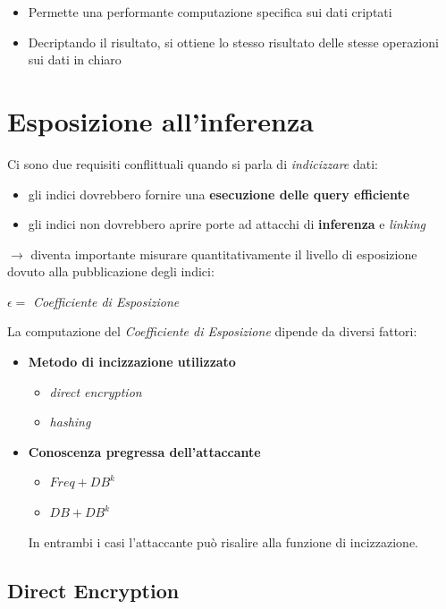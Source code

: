 \documentclass{report}
\begin{document}
\begin{itemize}
    \item Permette una performante computazione specifica sui dati criptati 
    \item Decriptando il risultato, si ottiene lo stesso risultato delle stesse operazioni sui dati in chiaro
\end{itemize}

\newpage
\section{Esposizione all'inferenza}

Ci sono due requisiti conflittuali quando si parla di 
\textit{indicizzare} dati:
\begin{itemize}
    \item gli indici dovrebbero fornire una \textbf{esecuzione delle query efficiente}
    \item gli indici non dovrebbero aprire porte ad attacchi di \textbf{inferenza} e \textit{linking}
\end{itemize}

$\rightarrow$ diventa importante misurare quantitativamente il livello di esposizione dovuto 
alla pubblicazione degli indici:

\centering $\epsilon =  $ \textit{Coefficiente di Esposizione}

\noindent La computazione del \textit{Coefficiente di Esposizione} dipende da diversi fattori:
\begin{itemize}
    \item \textbf{Metodo di incizzazione utilizzato}
    \begin{itemize}
        \item \textit{direct encryption}
        \item \textit{hashing}
    \end{itemize}
    \item \textbf{Conoscenza pregressa dell'attaccante}
    \begin{itemize}
        \item $Freq + DB^k$
        \item $DB + DB^k$
    \end{itemize}

    \noindent In entrambi i casi l'attaccante può risalire alla funzione di incizzazione.
\end{itemize}

\raggedright

\subsection{Direct Encryption}
\end{document}
